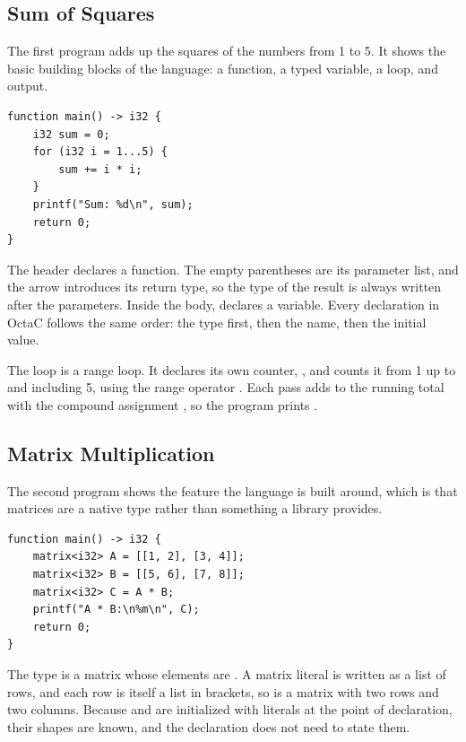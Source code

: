 \subsection{Sum of Squares}

The first program adds up the squares of the numbers from 1 to 5. It shows the
basic building blocks of the language: a function, a typed variable, a loop,
and output.

\begin{lstlisting}
function main() -> i32 {
    i32 sum = 0;
    for (i32 i = 1...5) {
        sum += i * i;
    }
    printf("Sum: %d\n", sum);
    return 0;
}
\end{lstlisting}

The header  declares a function. The empty
parentheses are its parameter list, and the arrow introduces its return type,
so the type of the result is always written after the parameters. Inside the
body,  declares a variable. Every declaration in OctaC
follows the same order: the type first, then the name, then the initial value.

The loop  is a range loop. It declares its own
counter, , and counts it from 1 up to and including 5, using the range
operator . Each pass adds  to the running total with the
compound assignment \code{+=}, so the program prints .

\subsection{Matrix Multiplication}

The second program shows the feature the language is built around, which is
that matrices are a native type rather than something a library provides.

\begin{lstlisting}
function main() -> i32 {
    matrix<i32> A = [[1, 2], [3, 4]];
    matrix<i32> B = [[5, 6], [7, 8]];
    matrix<i32> C = A * B;
    printf("A * B:\n%m\n", C);
    return 0;
}
\end{lstlisting}

The type  is a matrix whose elements are . A
matrix literal is written as a list of rows, and each row is itself a list in
brackets, so \code{[[1, 2], [3, 4]]} is a matrix with two rows and two
columns. Because  and  are initialized with literals at the
point of declaration, their shapes are known, and the declaration does not
need to state them.

